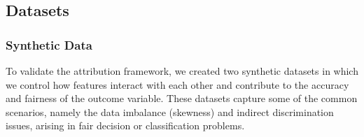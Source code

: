 \subsection{Datasets}
\newcommand{\bern}{\text{Ber}}

\subsubsection{Synthetic Data} \label{syn_data_sec}
To validate the attribution framework, we created two synthetic datasets in which we control how features interact with each other and contribute to the accuracy and fairness of the outcome variable.
These datasets capture some of the common scenarios, namely the data imbalance (skewness) and indirect discrimination issues, arising in fair decision or classification problems.


